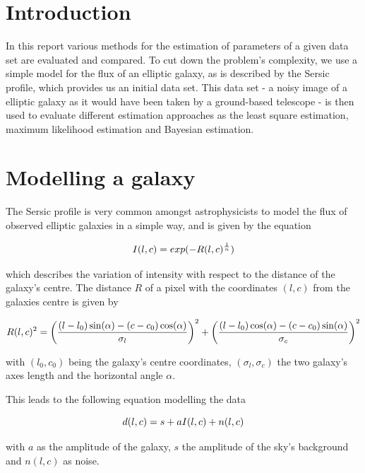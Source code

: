 
\section{Introduction}
In this report various methods for the estimation of parameters of a given data set are evaluated and compared. To cut down the problem's complexity, we use a simple model for the flux of an elliptic galaxy, as is described by the Sersic profile, which provides us an initial data set. This data set - a noisy image of a elliptic galaxy as it would have been taken by a ground-based telescope - is then used to evaluate different estimation approaches as the least square estimation, maximum likelihood estimation and Bayesian estimation.\\

\section{Modelling a galaxy}
The Sersic profile is very common amongst astrophysicists to model the flux of observed elliptic galaxies in a simple way, and is given by the equation

\begin{equation}
	\centering
	I(l,c) = exp(-R(l,c)^{\frac{1}{n}})
\end{equation}

which describes the variation of intensity with respect to the distance of the galaxy's centre.
The distance $R$ of a pixel with the coordinates $(l,c)$ from the galaxies centre is given by 

\begin{equation}
	\centering
	R(l,c)^2 = \bigg(\frac{(l-l_0)\sin(\alpha) - (c - c_0)\cos(\alpha)}{\sigma_l}\bigg)^2 + \bigg(\frac{(l-l_0)\cos(\alpha) - (c - c_0)\sin(\alpha)}{\sigma_c}\bigg)^2
\end{equation}

with $(l_0,c_0)$ being the galaxy's centre coordinates, $(\sigma_l,\sigma_c)$ the two galaxy's axes length and the horizontal angle $\alpha$.

This leads to the following equation modelling the data

\begin{equation}
	\centering
	d(l,c) = s + a I(l,c) + n(l,c)
\label{eq:dlc}
\end{equation}

with $a$ as the amplitude of the galaxy, $s$ the amplitude of the sky's background and $n(l,c)$ as noise.

